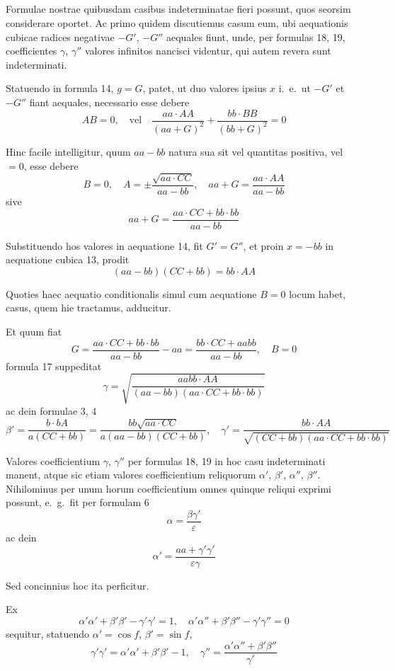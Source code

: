 \documentclass[12pt,a4paper]{article}
\begin{document}
\setcounter{subsection}{9}
\subsection{}

Formulae nostrae quibusdam casibus indeterminatae fieri possunt, quos seorsim considerare oportet. Ac primo quidem discutiemus casum eum, ubi aequationis cubicae radices negativae $-G'$, $-G''$ aequales fiunt, unde, per formulas 18, 19, coefficientes $\gamma$, $\gamma''$ valores infinitos nancisci videntur, qui autem revera sunt indeterminati.

Statuendo in formula 14, $g=G$, patet, ut duo valores ipsius $x$ i.~e.\ ut $-G'$ et $-G''$ fiant aequales, necessario esse debere
\[
AB = 0, \quad\text{vel}\quad \frac{aa\cdot AA}{(aa+G)^2} + \frac{bb\cdot BB}{(bb+G)^2} = 0
\]

Hinc facile intelligitur, quum $aa-bb$ natura sua sit vel quantitas positiva, vel $=0$, esse debere
\[
B = 0, \quad A = \pm\frac{\sqrt{aa\cdot CC}}{aa-bb}, \quad aa+G = \frac{aa\cdot AA}{aa-bb}
\]
sive
\[
aa+G = \frac{aa\cdot CC+bb\cdot bb}{aa-bb}
\]

Substituendo hos valores in aequatione 14, fit $G'=G''$, et proin $x=-bb$ in aequatione cubica 13, prodit
\[
(aa-bb)(CC+bb) = bb\cdot AA
\]

Quoties haec aequatio conditionalis simul cum aequatione $B=0$ locum habet, casus, quem hie tractamus, adducitur.

Et quum fiat
\[
G = \frac{aa\cdot CC+bb\cdot bb}{aa-bb} - aa = \frac{bb\cdot CC+aabb}{aa-bb}, \quad B=0
\]
formula 17 suppeditat
\[
\gamma = \sqrt{\frac{aabb\cdot AA}{(aa-bb)(aa\cdot CC+bb\cdot bb)}}
\]
ac dein formulae 3, 4
\[
\beta' = \frac{b\cdot bA}{a(CC+bb)} = \frac{bb\sqrt{aa\cdot CC}}{a(aa-bb)(CC+bb)}, \quad
\gamma' = \frac{bb\cdot AA}{\sqrt{(CC+bb)(aa\cdot CC+bb\cdot bb)}}
\]

Valores coefficientium $\gamma$, $\gamma''$ per formulas 18, 19 in hoc casu indeterminati manent, atque sic etiam valores coefficientium reliquorum $\alpha'$, $\beta'$, $\alpha''$, $\beta''$. Nihilominus per unum horum coefficientium omnes quinque reliqui exprimi possunt, e.~g.\ fit per formulam 6
\[
\alpha = \frac{\beta\gamma'}{\varepsilon}
\]
ac dein
\[
\alpha' = \frac{aa+\gamma'\gamma'}{\varepsilon\gamma}
\]

Sed concinnius hoc ita perficitur.

Ex
\[
\alpha'\alpha' + \beta'\beta' - \gamma'\gamma' = 1, \quad \alpha'\alpha'' + \beta'\beta'' - \gamma'\gamma'' = 0
\]
sequitur, statuendo $\alpha' = \cos f$, $\beta' = \sin f$,
\[
\gamma'\gamma' = \alpha'\alpha' + \beta'\beta' - 1, \quad \gamma'' = \frac{\alpha'\alpha'' + \beta'\beta''}{\gamma'}
\]
\end{document}
